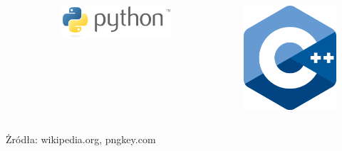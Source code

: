 \begin{frame}
\begin{columns}
\begin{column}{0.25\textwidth}
\begin{figure}
\begin{center}
				\end{center}
			\end{figure}
		\end{column}
				\begin{column}{0.25\textwidth}
			\begin{figure}
				\begin{center}
					\includegraphics[width=\textwidth]{img/Python_logo.png}			
				\end{center}
			\end{figure}
		\end{column}
		\begin{column}{0.25\textwidth}  %
						\begin{figure}
				\begin{center}
					\includegraphics[width=\textwidth]{img/C++_Logo.png}
				\end{center}
			\end{figure}
		\end{column}
	\end{columns}
\footnotesize{Żródła: wikipedia.org, pngkey.com}
\end{frame}

